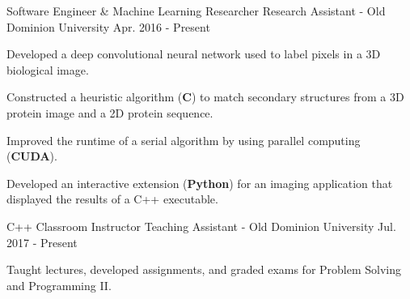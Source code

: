 \begin{cventries}
  \cventry
    {Software Engineer \& Machine Learning Researcher}
    {Research Assistant - Old Dominion University}
    {Apr. 2016 - Present}
    {}
    {
      \begin{cvitems}
        \item {Developed a deep convolutional neural network used to label pixels in a 3D biological
image.}
        \item {Constructed a heuristic algorithm (\textbf{C}) to match secondary structures from a 3D protein
image and a 2D protein sequence.}
        \item {Improved the runtime of a serial algorithm by using parallel computing (\textbf{CUDA}).}
        \item {Developed an interactive extension (\textbf{Python}) for an imaging application that displayed the results of a C++ executable.}
      \end{cvitems}
    }
  \cventry
    {C++ Classroom Instructor}
    {Teaching Assistant - Old Dominion University}
    {Jul. 2017 - Present}
    {}
    {
      \begin{cvitems}
        \item {Taught lectures, developed assignments, and graded exams for Problem Solving and Programming II.}
      \end{cvitems}
    }
\end{cventries}
